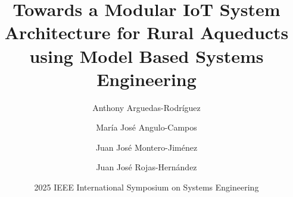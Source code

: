 \documentclass{beamer}
\title{Towards a Modular IoT System Architecture for Rural Aqueducts using Model Based Systems Engineering}
\author{Anthony Arguedas-Rodríguez \and María José Angulo-Campos \and Juan José Montero-Jiménez \and Juan José Rojas-Hernández}
\date{2025 IEEE International Symposium on Systems Engineering}
\begin{document}
\frame{\titlepage}
\end{document}
